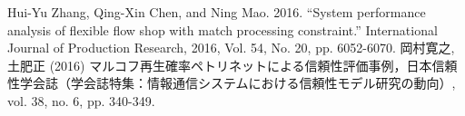 \renewcommand{\bibname}{Bibliography}

\begin{thebibliography}{99}

Hui-Yu Zhang, Qing-Xin Chen, and Ning Mao. 2016. ``System performance analysis of flexible flow shop with match processing constraint.'' International Journal of Production Research, 2016, Vol. 54, No. 20, pp. 6052-6070.
岡村寛之, 土肥正 (2016) マルコフ再生確率ペトリネットによる信頼性評価事例，日本信頼性学会誌（学会誌特集：情報通信システムにおける信頼性モデル研究の動向）, vol. 38, no. 6, pp. 340-349.


\end{thebibliography}
